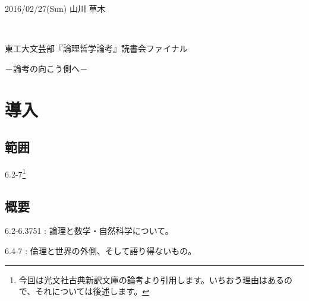 \documentclass[12pt]{jsarticle}
\begin{document}
\newcommand{\bvec}[1]{\mbox{\boldmath $#1$}}
\begin{flushright}
2016/02/27(Sun) 山川 草木
\end{flushright}　\\ 
\begin{LARGE}
東工大文芸部『論理哲学論考』読書会ファイナル
\end{LARGE}
\begin{flushright}
－論考の向こう側へ－
\end{flushright}

\section{導入}
\subsection*{範囲}
6.2-7\footnote{今回は光文社古典新訳文庫の論考より引用します。いちおう理由はあるので、それについては後述します。}\

\subsection*{概要} 
6.2-6.3751 : 論理と数学・自然科学について。\par
6.4-7 : 倫理と世界の外側、そして語り得ないもの。 
\end{document}
